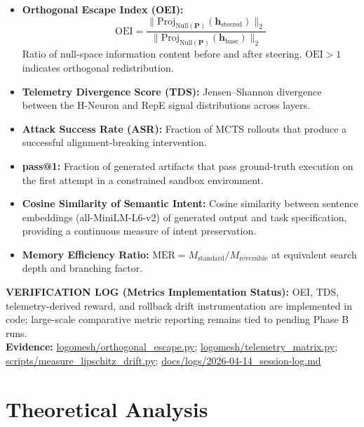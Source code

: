\documentclass[10pt]{article}
\newcommand{\verifybox}[3]{%
\vspace{0.6em}
\noindent\colorbox{yellow!20}{%
\parbox{\dimexpr\linewidth-2\fboxsep\relax}{%
\textbf{VERIFICATION LOG (#1):} #2\\
\textbf{Evidence:} #3
}}%
\vspace{0.6em}
}
\begin{document}
\begin{itemize}[leftmargin=*]
    \item \textbf{Orthogonal Escape Index (OEI):}
    \begin{equation}
    \text{OEI} = \frac{\|\text{Proj}_{\text{Null}(\mathbf{P})}(\mathbf{h}_{\text{steered}})\|_2}{\|\text{Proj}_{\text{Null}(\mathbf{P})}(\mathbf{h}_{\text{base}})\|_2}
    \label{eq:oei}
    \end{equation}
    Ratio of null-space information content before and after steering. $\text{OEI} > 1$ indicates orthogonal redistribution.

    \item \textbf{Telemetry Divergence Score (TDS):} Jensen--Shannon divergence between the H-Neuron and RepE signal distributions across layers.

    \item \textbf{Attack Success Rate (ASR):} Fraction of MCTS rollouts that produce a successful alignment-breaking intervention.

    \item \textbf{pass@1:} Fraction of generated artifacts that pass ground-truth execution on the first attempt in a constrained sandbox environment.

    \item \textbf{Cosine Similarity of Semantic Intent:} Cosine similarity between sentence embeddings (all-MiniLM-L6-v2) of generated output and task specification, providing a continuous measure of intent preservation.

    \item \textbf{Memory Efficiency Ratio:} $\text{MER} = M_{\text{standard}} / M_{\text{reversible}}$ at equivalent search depth and branching factor.
\end{itemize}

\verifybox
{Metrics Implementation Status}
{OEI, TDS, telemetry-derived reward, and rollback drift instrumentation are implemented in code; large-scale comparative metric reporting remains tied to pending Phase B runs.}
{\url{logomesh/orthogonal_escape.py}; \url{logomesh/telemetry_matrix.py}; \url{scripts/measure_lipschitz_drift.py}; \url{docs/logs/2026-04-14_session-log.md}}

\section{Theoretical Analysis}
\end{document}
